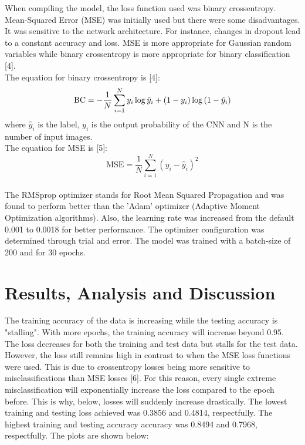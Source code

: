 \documentclass[11pt, a4page]{article}
\begin{document}
When compiling the model, the loss function used was binary crossentropy. Mean-Squared Error (MSE) was initially used but there were some disadvantages. It was sensitive to the network architecture. For instance, changes in dropout lead to a constant accuracy and loss. MSE is more appropriate for Gaussian random variables while binary crossentropy is more appropriate for binary classification [4]. 
\\

The equation for binary crossentropy is [4]:
\begin{equation}
\mathrm{BC} = -\frac{1}{N} \sum_{i=1}^{N} y_{i}\log{\hat{y}_{i}} + (1-y_{i})\log{(1-\hat{y}_{i})}\\
\end{equation}
where $\hat{y}_{i}$ is the label, $y_{i}$ is the output probability of the CNN and N is the number of input images. \\

The equation for MSE is [5]:
\begin{equation}
\mathrm{MSE}=\frac{1}{N} \sum_{i=1}^{N}\left(y_{i}-\hat{y}_{i}\right)^{2}
\end{equation}
\\


The RMSprop optimizer stands for Root Mean Squared Propagation and was found to perform better than the 'Adam' optimizer (Adaptive Moment Optimization algorithms). Also, the learning rate was increased from the default 0.001 to 0.0018 for better performance. The optimizer configuration was determined through trial and error. The model was trained with a batch-size of 200 and for 30 epochs. 



\pagebreak
\section{Results, Analysis and Discussion}

The training accuracy of the data is increasing while the testing accuracy is "stalling". With more epochs, the training accuracy will increase beyond 0.95. The loss decreases for both the training and test data but stalls for the test data. However, the loss still remains high in contrast to when the MSE loss functions were used. This is due to crossentropy losses being more sensitive to misclassifications than MSE losses [6]. For this reason, every single extreme misclassification will exponentially increase the loss compared to the epoch before. This is why, below, losses will suddenly increase drastically. The lowest training and testing loss achieved was 0.3856 and 0.4814, respectfully. The highest training and testing accuracy accuracy was 0.8494 and 0.7968, respectfully. The plots are shown below:
\\
\end{document}
